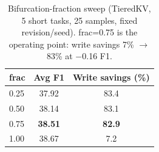 \begin{table}[t]
\centering
\small
\caption{Bifurcation-fraction sweep (TieredKV, 5 short tasks, 25 samples, fixed revision/seed). frac=0.75 is the operating point: write savings 7\% $\to$ 83\% at $-$0.16 F1.}
\label{tab:frac_ablation}
\begin{tabular}{lcc}
\toprule
\textbf{frac} & \textbf{Avg F1} & \textbf{Write savings (\%)} \\
\midrule
0.25 & 37.92 & 83.4 \\
0.50 & 38.14 & 83.1 \\
0.75 & \textbf{38.51} & \textbf{82.9} \\ %
1.00 & 38.67 & 7.2 \\
\bottomrule
\end{tabular}
\end{table}
